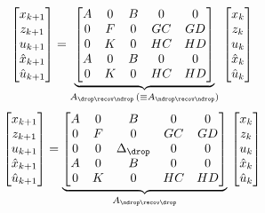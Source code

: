 %
\begin{equation}
    \begin{bmatrix}
        x_{k+1} \\
        z_{k+1} \\
        u_{k+1} \\
        \hat x_{k+1} \\
        \hat u_{k+1}
    \end{bmatrix} = \underbrace{\begin{bmatrix}
        A & 0 & B & 0 & 0 \\
        0 & F & 0 & GC & GD \\
        0 & K & 0 & HC & HD \\
        A & 0 & B & 0 & 0 \\
        0 & K & 0 & HC & HD \\
    \end{bmatrix}}_{A_{\drop\recov\ndrop}\, (\equiv A_{\ndrop\recov\ndrop})}\, \begin{bmatrix}
        x_{k} \\
        z_{k} \\
        u_{k} \\
        \hat x_{k} \\
        \hat u_{k}
    \end{bmatrix}
\end{equation}
%
\begin{equation}
    \begin{bmatrix}
        x_{k+1} \\
        z_{k+1} \\
        u_{k+1} \\
        \hat x_{k+1} \\
        \hat u_{k+1}
    \end{bmatrix} = \underbrace{\begin{bmatrix}
        A & 0 & B & 0 & 0 \\
        0 & F & 0 & GC & GD \\
        0 & 0 & \Delta_\drop & 0 & 0 \\
        A & 0 & B & 0 & 0 \\
        0 & K & 0 & HC & HD \\
    \end{bmatrix}}_{A_{\ndrop\recov\drop}}\, \begin{bmatrix}
        x_{k} \\
        z_{k} \\
        u_{k} \\
        \hat x_{k} \\
        \hat u_{k}
    \end{bmatrix}
\end{equation}
